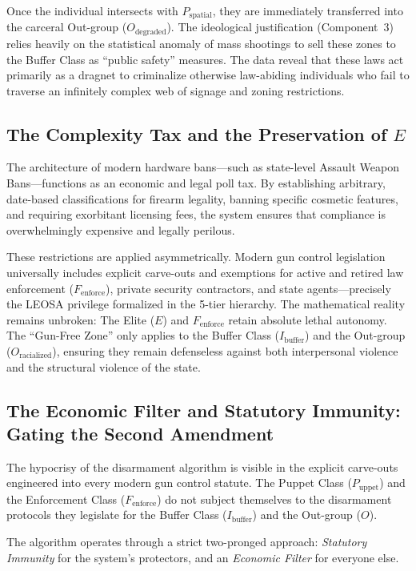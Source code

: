 Once the individual intersects with $P_{\text{spatial}}$, they are immediately transferred into the carceral Out-group ($O_{\text{degraded}}$). The ideological justification (Component~3) relies heavily on the statistical anomaly of mass shootings to sell these zones to the Buffer Class as ``public safety'' measures. The data reveal that these laws act primarily as a dragnet to criminalize otherwise law-abiding individuals who fail to traverse an infinitely complex web of signage and zoning restrictions.

\subsection{The Complexity Tax and the Preservation of \texorpdfstring{$E$}{E}}
The architecture of modern hardware bans---such as state-level Assault Weapon Bans---functions as an economic and legal poll tax. By establishing arbitrary, date-based classifications for firearm legality, banning specific cosmetic features, and requiring exorbitant licensing fees, the system ensures that compliance is overwhelmingly expensive and legally perilous.

These restrictions are applied asymmetrically. Modern gun control legislation universally includes explicit carve-outs and exemptions for active and retired law enforcement ($F_{\text{enforce}}$), private security contractors, and state agents---precisely the LEOSA privilege formalized in the 5-tier hierarchy. The mathematical reality remains unbroken: The Elite ($E$) and $F_{\text{enforce}}$ retain absolute lethal autonomy. The ``Gun-Free Zone'' only applies to the Buffer Class ($I_{\text{buffer}}$) and the Out-group ($O_{\text{racialized}}$), ensuring they remain defenseless against both interpersonal violence and the structural violence of the state.

\subsection{The Economic Filter and Statutory Immunity: Gating the Second Amendment}

The hypocrisy of the disarmament algorithm is visible in the explicit carve-outs engineered into every modern gun control statute. The Puppet Class ($P_{\text{uppet}}$) and the Enforcement Class ($F_{\text{enforce}}$) do not subject themselves to the disarmament protocols they legislate for the Buffer Class ($I_{\text{buffer}}$) and the Out-group ($O$).

The algorithm operates through a strict two-pronged approach: \textit{Statutory Immunity} for the system's protectors, and an \textit{Economic Filter} for everyone else.

